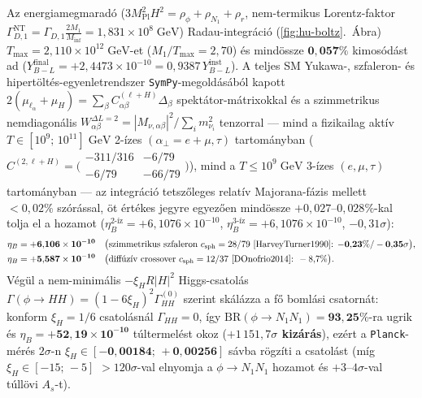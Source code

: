 \documentclass[11pt,a4paper]{article}
\begin{document}
Az energiamegmaradó ($3M_{\mathrm{Pl}}^2 H^2 = \rho_\phi + \rho_{N_1} + \rho_r$, nem-termikus Lorentz-faktor $\Gamma_{D,1}^{\mathrm{NT}} = \Gamma_{D,1}\frac{2M_1}{M_{\mathrm{inf}}} = 1{,}831\times 10^8\;\mathrm{GeV}$) Radau-integráció (\ref{fig:hu-boltz}.\ Ábra) $T_{\max} = 2{,}110\times 10^{12}\;\mathrm{GeV}$-et ($M_1/T_{\max} = 2{,}70$) és mindössze $\mathbf{0{,}057\%}$ kimosódást ad ($Y_{B-L}^{\mathrm{final}} = +2{,}4473\times 10^{-10} = 0{,}9387\,Y_{B-L}^{\mathrm{inst}}$). A teljes SM Yukawa-, szfaleron- és hipertöltés-egyenletrendszer \texttt{SymPy}-megoldásából kapott $2(\mu_{\ell_\alpha}+\mu_H) = \sum_\beta C_{\alpha\beta}^{(\ell+H)}\Delta_\beta$ spektátor-mátrixokkal és a szimmetrikus nemdiagonális $W_{\alpha\beta}^{\Delta L=2} = |M_{\nu,\alpha\beta}|^2/\sum_i m_{\nu_i}^2$ tenzorral \cite{Abada2006,Nardi2006} — mind a fizikailag aktív $T \in [10^9;\,10^{11}]\;\mathrm{GeV}$ 2-ízes $(\alpha_\perp = e+\mu,\tau)$ tartományban ($C^{(2,\ell+H)} = \bigl(\begin{smallmatrix}-311/316 & -6/79\\ -6/79 & -66/79\end{smallmatrix}\bigr)$), mind a $T \le 10^9\;\mathrm{GeV}$ 3-ízes $(e,\mu,\tau)$ tartományban — az integráció tetszőleges relatív Majorana-fázis mellett $<0{,}02\%$ szórással, öt értékes jegyre egyezően mindössze $+0{,}027\text{--}0{,}028\%$-kal tolja el a hozamot ($\eta_B^{\text{2-íz}} = +6{,}1076\times 10^{-10}$, $\eta_B^{\text{3-íz}} = +6{,}1076\times 10^{-10}$, $-0{,}31\sigma$):
\begin{align}
\eta_B &= \mathbf{+6{,}106\times 10^{-10}}\quad\bigl(\text{szimmetrikus szfaleron } c_{\mathrm{sph}} = 28/79\text{ \cite{HarveyTurner1990}: }\mathbf{-0{,}23\% / -0{,}35\sigma}\bigr), \nonumber\\
\eta_B &= \mathbf{+5{,}587\times 10^{-10}}\quad\bigl(\text{diffúzív crossover } c_{\mathrm{sph}} = 12/37\text{ \cite{DOnofrio2014}: }-8{,}7\%\bigr).
\end{align}
Végül a nem-minimális $-\xi_H R|H|^2$ Higgs-csatolás $\Gamma(\phi\to HH) = (1-6\xi_H)^2\Gamma_{HH}^{(0)}$ szerint skálázza a fő bomlási csatornát: konform $\xi_H = 1/6$ csatolásnál \cite{GorbunovTokareva2013} $\Gamma_{HH} = 0$, így $\mathrm{BR}(\phi\to N_1 N_1) = \mathbf{93{,}25\%}$-ra ugrik és $\eta_B = \mathbf{+52{,}19\times 10^{-10}}$ túltermelést okoz (\textbf{$+1\,151{,}7\sigma$ kizárás}), ezért a \texttt{Planck}-mérés $2\sigma$-n $\xi_H \in \mathbf{[-0{,}00184;\,+0{,}00256]}$ sávba rögzíti a csatolást (míg $\xi_H \in [-15;\,-5]$ $>120\sigma$-val elnyomja a $\phi\to N_1 N_1$ hozamot és $+3\text{--}4\sigma$-val túllövi $A_s$-t).
\end{document}
